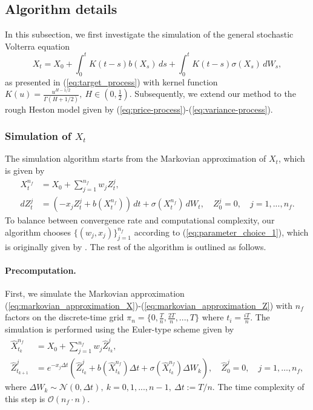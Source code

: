 \documentclass[11pt]{article}%
\theoremstyle{definition}
\begin{document}
\subsection{Algorithm details}
In this subsection, we first investigate the simulation of the general stochastic Volterra equation 
\[
X_t = X_0 + \int_{0}^{t} K(t-s) b(X_s)\,ds + \int_{0}^{t} K(t-s) \sigma(X_s)\,dW_s,
\]
as presented in (\ref{eq:target_process}) with kernel function \(K(u)=\tfrac{u^{H-1/2}}{\Gamma(H+1/2)},\ H\in(0,\tfrac{1}{2})\). Subsequently, we extend our method to the rough Heston model given by (\ref{eq:price-process})-(\ref{eq:variance-process}).

\subsubsection{Simulation of \(X_t\)}\label{sec:simulation_X}

The simulation algorithm starts from the Markovian approximation of \(X_t\), which is given by
\begin{align}
    X_t^{n_f} &= X_0 + \sum_{j=1}^{n_f} w_j Z_t^j,\label{eq:markovian_approximation_X}\\
    dZ_t^j &= (-x_j Z_t^j + b(X_t^{n_f}))\,dt + \sigma(X_t^{n_f})\,dW_t,\quad Z_0^j = 0,\quad j=1,...,n_f.\label{eq:markovian_approximation_Z}
\end{align}
To balance between convergence rate and computational complexity, our algorithm chooses \(\{(w_j,x_j)\}_{j=1}^{n_f}\) according to (\ref{eq:parameter_choice_1}), which is originally given by \cite{abijaber2018}. The rest of the algorithm is outlined as follows.

    \paragraph{Precomputation.} First, we simulate the Markovian approximation (\ref{eq:markovian_approximation_X})-(\ref{eq:markovian_approximation_Z}) with \(n_f\) factors on the discrete-time grid \(\pi_n = \{0,\tfrac{T}{n},\tfrac{2T}{n},...,T\}\) where \(t_i = \tfrac{iT}{n}\). The simulation is performed using the Euler-type scheme given by 
    \begin{align}
        \widehat{X}_{t_k}^{n_f} &= X_0 + \sum_{j=1}^{n_f} w_j \widehat{Z}_{t_k}^j,\label{eq:markovian_X_update}\\
        \widehat{Z}_{t_{k+1}}^j &= e^{-x_j \Delta t} \left(
        \widehat{Z}_{t_k}^j + b(\widehat{X}_{t_k}^{n_f}) \Delta t + \sigma(\widehat{X}_{t_k}^{n_f})\Delta W_k
        \right),\quad \widehat{Z}_{0}^{j}=0,\quad j=1,\ldots,n_f,\label{eq:markovian_Z_update}
    \end{align}
    where \(\Delta W_k \sim \mathcal{N}(0,\Delta t),\ k=0,1,...,n-1,\ \Delta t := T/n\). The time complexity of this step is \(\mathcal{O}(n_f\cdot n)\).
\end{document}
